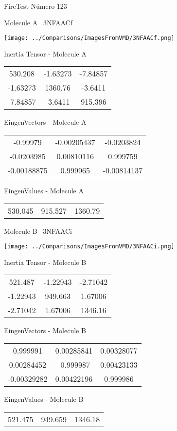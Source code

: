 \vtab[-3cm]
\begin{center}
{\large FireTest \tab Número 123}
\end{center}
\begin{multicols}{2}
\begin{center}

Molecule A \
3NFAACf

\texttt{[image: ../Comparisons/ImagesFromVMD/3NFAACf.png]}

Inertia Tensor - Molecule A \\
\begin{tabular}{|c c c|}
530.208	 & 	-1.63273	 & 	-7.84857	 \\
-1.63273	 & 	1360.76	 & 	-3.6411	 \\
-7.84857	 & 	-3.6411	 & 	915.396
\end{tabular}

\vtab
 EingenVectors - Molecule A     \\
\begin{tabular}{|c c c|}
-0.99979	 & 	-0.00205437	 & 	-0.0203824	 \\
-0.0203985	 & 	0.00810116	 & 	0.999759	 \\
-0.00188875	 & 	0.999965	 & 	-0.00814137
\end{tabular}

\vtab
 EingenValues - Molecule A     \\
\begin{tabular}{|c c c|}
530.045	 & 	915.527	 & 	1360.79	 \\
\end{tabular}
\columnbreak

Molecule B \
3NFAACi

\texttt{[image: ../Comparisons/ImagesFromVMD/3NFAACi.png]}

Inertia Tensor - Molecule B \\
\begin{tabular}{|c c c|}
521.487	 & 	-1.22943	 & 	-2.71042	 \\
-1.22943	 & 	949.663	 & 	1.67006	 \\
-2.71042	 & 	1.67006	 & 	1346.16
\end{tabular}

\vtab
 EingenVectors - Molecule B     \\
\begin{tabular}{|c c c|}
0.999991	 & 	0.00285841	 & 	0.00328077	 \\
0.00284452	 & 	-0.999987	 & 	0.00423133	 \\
-0.00329282	 & 	0.00422196	 & 	0.999986
\end{tabular}

\vtab
 EingenValues - Molecule B     \\
\begin{tabular}{|c c c|}
521.475	 & 	949.659	 & 	1346.18	 \\
\end{tabular}

\end{center}
\end{multicols}

